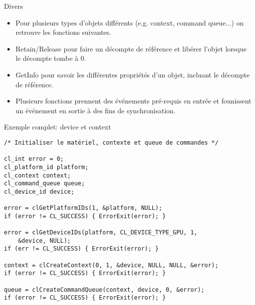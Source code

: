 \documentclass[10pt]{beamer}
\begin{document}
\begin{frame}{Divers}

  \begin{itemize}
    \item Pour plusieurs types d'objets différents (e.g. context, command queue...) on retrouve les fonctions suivantes.

    \item Retain/Release pour faire un décompte de référence et libérer l'objet lorsque le décompte tombe à 0.

    \item GetInfo pour savoir les différentes propriétés d'un objet, incluant le décompte de référence.

    \item Plusieurs fonctions prennent des événements pré-requis en entrée et founissent un événement en sortie à des fins de synchronisation.
  \end{itemize}
\end{frame}

\begin{frame}[fragile]{Exemple complet: device et context}

  \scriptsize
  \begin{verbatim}
/* Initialiser le matériel, contexte et queue de commandes */

cl_int error = 0;
cl_platform_id platform;
cl_context context;
cl_command_queue queue;
cl_device_id device;

error = clGetPlatformIDs(1, &platform, NULL);
if (error != CL_SUCCESS) { ErrorExit(error); }

error = clGetDeviceIDs(platform, CL_DEVICE_TYPE_GPU, 1,
    &device, NULL);
if (err != CL_SUCCESS) { ErrorExit(error); }

context = clCreateContext(0, 1, &device, NULL, NULL, &error);
if (error != CL_SUCCESS) { ErrorExit(error); }

queue = clCreateCommandQueue(context, device, 0, &error);
if (error != CL_SUCCESS) { ErrorExit(error); }
  \end{verbatim}
\end{frame}
\end{document}
